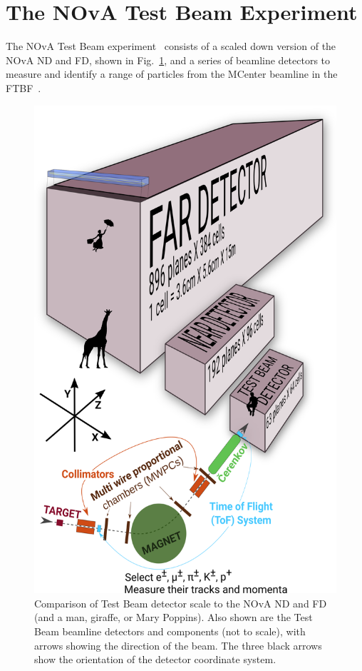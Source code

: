 \section{The NOvA Test Beam Experiment}\label{sec:TBExperiment}

The \gls{NOvA} Test Beam experiment~\cite{NOvA-doc-22172} consists of a scaled down version of the \gls{NOvA} \gls{ND} and \gls{FD}, shown in Fig.~\ref{fig:TBDetector}, and a series of beamline detectors to measure and identify a range of particles from the MCenter beamline in the \gls{FTBF}~\cite{FTBFWebsite}.

\begin{figure}[!ht]
\centering
\includegraphics[width=.7\textwidth]{Plots/TBCalibration/TestBeamDetectorWithArrows.png}
\caption[Comparison of Test Beam detector to the Near and Far Detectors]{Comparison of Test Beam detector scale to the \acrshort{NOvA} \acrshort{ND} and \acrshort{FD} (and a man, giraffe, or Mary Poppins). Also shown are the Test Beam beamline detectors and components (not to scale), with arrows showing the direction of the beam. The three black arrows show the orientation of the detector coordinate system.}
\label{fig:TBDetector}
\end{figure}

